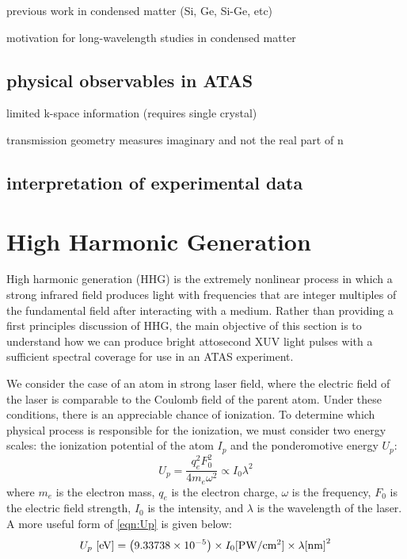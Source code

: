 previous work in condensed matter (Si, Ge, Si-Ge, etc)

motivation for long-wavelength studies in condensed matter

\subsection{physical observables in ATAS}
limited k-space information (requires single crystal)

transmission geometry measures imaginary and not the real part of n

\subsection{interpretation of experimental data}

\section{High Harmonic Generation}

High harmonic generation (HHG) is the extremely nonlinear process in which a strong infrared field produces light with frequencies that are integer multiples of the fundamental field after interacting with a medium. Rather than providing a first principles discussion of HHG, the main objective of this section is to understand how we can produce bright attosecond XUV light pulses with a sufficient spectral coverage for use in an ATAS experiment.


We consider the case of an atom in strong laser field, where the electric field of the laser is comparable to the Coulomb field of the parent atom. Under these conditions, there is an appreciable chance of ionization. To determine which physical process is responsible for the ionization, we must consider two energy scales: the ionization potential of the atom $I_p$ and the ponderomotive energy $U_p$:
\begin{equation}
U_p = \frac{q_e^2 F_0^2}{4 m_e \omega^2} \propto I_0 \lambda^2
\label{eqn:Up}
\end{equation}
where $m_e$ is the electron mass, $q_e$ is the electron charge, $\omega$ is the frequency, $F_0$ is the electric field strength, $I_0$ is the intensity, and $\lambda$ is the wavelength of the laser. A more useful form of \cref{eqn:Up} is given below:
\begin{equation}
U_p \textrm{ [eV]} = \left( 9.33738 \times 10^{-5} \right) \times I_0 \textrm{[PW/cm\textsuperscript{2}]} \times \lambda\textrm{[nm]}^2
\end{equation}


